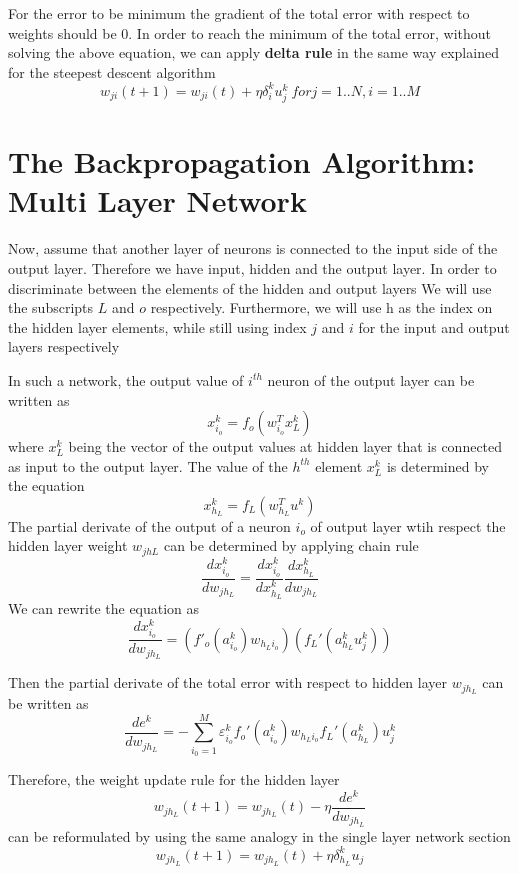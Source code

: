 \documentclass[12pt, a4paper, twoside]{book}
\begin{document}
For the error to be minimum the gradient of the total error with respect to weights should be 0.
In order to reach the minimum of the total error, without solving the above equation, we can apply \textbf{delta rule} in the same way explained for the steepest descent algorithm
\[w_{ji}(t+1) =  w_{ji}(t) + \eta\delta_i^ku_j^k \ for j=1..N, i=1..M\]

\section{The Backpropagation Algorithm: Multi Layer Network}

Now, assume that another layer of neurons is connected to the input side of the output layer.
Therefore we have input, hidden and the output layer. In order to discriminate between the elements of the hidden and output layers
We will use the subscripts $L$ and $o$ respectively.
Furthermore, we will use h as the index on the hidden layer elements, while still using index $j$ and $i$ for the input and output layers respectively

In such a network, the output value of $i^{th}$ neuron of the output layer can be written as 
\[x_{i_o}^k=f_o(w_{i_o}^Tx_L^k)\]
where $x_L^k$ being the vector of the output values at hidden layer that is connected as input to the output layer. The value of the $h^{th}$ element $x_L^k$ is determined by the equation
\[x_{h_L}^k=f_L(w_{h_L}^Tu^k)\]
The partial derivate of the output of a neuron $i_o$ of output layer wtih respect the hidden layer weight $w_{jhL}$ can be determined by applying chain rule
\[\frac{dx_{i_o}^k}{dw_{jh_L}} = \frac{dx_{i_o}^k}{dx_{h_L}^k}  \frac{dx_{h_L}^k}{dw_{jh_L}} \]
We can rewrite the equation as 
\[\frac{dx_{i_o}^k}{dw_{jh_L}} = (f'_o(a_{i_o}^k)w_{h_Li_o})(f_L'(a_{h_L}^ku_j^k))\]

Then the partial derivate of the total error with respect to hidden layer $w_{jh_L}$ can be written as
\[\frac{de^k}{dw_{jh_L}}= - \sum_{i_0=1}^{M}\varepsilon_{i_o}^kf_o'(a_{i_o}^k)w_{h_Li_o}f_L'(a_{h_L}^k)u_j^k\] 

Therefore, the weight update rule for the hidden layer
\[w_{jh_L}(t+1)= w_{jh_L}(t) - \eta \frac{de^k}{dw_{jh_L}}\]
can be reformulated by using the same analogy in the single layer network section
\[w_{jh_L}(t+1) = w_{jh_L}(t) + \eta\delta_{h_L}^ku_j\]
\end{document}
